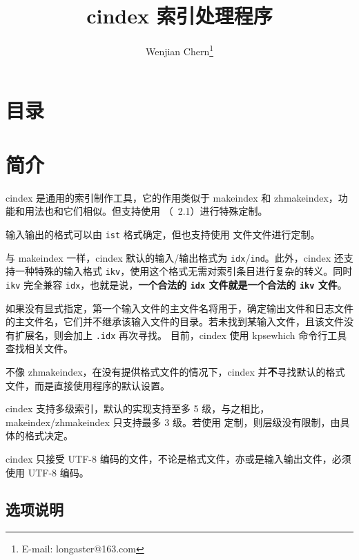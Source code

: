 \documentclass[class=article,doc={kv-usage}]{cusdoc}
\newcommand*\LUA{\texorpdfstring{\textcon{lua}}{lua}}
\newcommand*\LUAJIT{\texorpdfstring{\textcon{luajit}}{luajit}}
\begin{document}
\title{cindex 索引处理程序}
\author{Wenjian Chern\thanks{E-mail: longaster@163.com}}
\maketitle
\stopextrawidth

\section*{目录}


\section{简介}

cindex 是通用的索引制作工具，它的作用类似于 makeindex 和 zhmakeindex，功能和用法也和它们相似。但支持使用 \LUA（\LUAJIT~2.1）进行特殊定制。

输入输出的格式可以由 \texttt{ist} 格式确定，但也支持使用 \LUA 文件文件进行定制。

与 makeindex 一样，cindex 默认的输入/输出格式为 \texttt{idx}/\texttt{ind}。此外，cindex 还支持一种特殊的输入格式 \texttt{ikv}，使用这个格式无需对索引条目进行复杂的转义。同时 \texttt{ikv} 完全兼容 \texttt{idx}，也就是说，{\bfseries 一个合法的 \texttt{idx} 文件就是一个合法的 \texttt{ikv} 文件}。

如果没有显式指定，第一个输入文件的主文件名将用于，确定输出文件和日志文件的主文件名，它们并不继承该输入文件的目录。若未找到某输入文件，且该文件没有扩展名，则会加上 \texttt{.idx} 再次寻找。
目前，cindex 使用 kpsewhich 命令行工具查找相关文件。

不像 zhmakeindex，在没有提供格式文件的情况下，cindex 并\textbf{不}寻找默认的格式文件，而是直接使用程序的默认设置。

cindex 支持多级索引，默认的实现支持至多 5 级，与之相比，makeindex/zhmakeindex 只支持最多 3 级。若使用 \LUA 定制，则层级没有限制，由具体的格式决定。

cindex 只接受 UTF-8 编码的文件，不论是格式文件，亦或是输入输出文件，必须使用 UTF-8 编码。


\subsection{选项说明}
\end{document}
